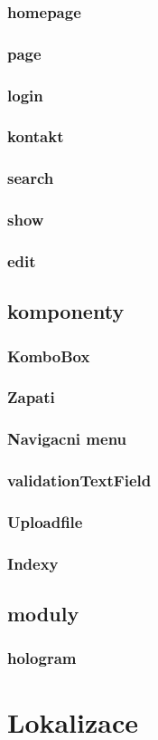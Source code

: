 \subsubsection{homepage}
\subsubsection{page}
\subsubsection{login}
\subsubsection{kontakt}
\subsubsection{search}
\subsubsection{show}
\subsubsection{edit}

\subsection{komponenty}
\subsubsection{KomboBox}
\subsubsection{Zapati}
\subsubsection{Navigacni menu}
\subsubsection{validationTextField}
\subsubsection{Uploadfile}
\subsubsection{Indexy}

\subsection{moduly}
\subsubsection{hologram}

\section{Lokalizace}
